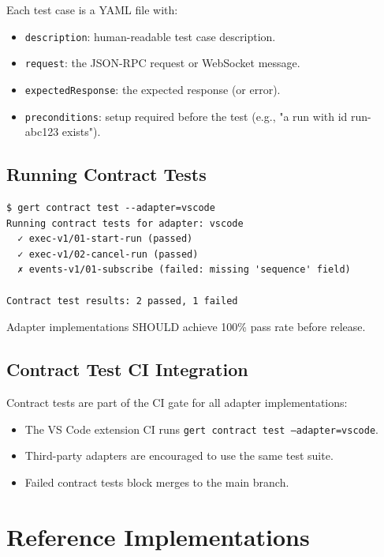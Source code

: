 Each test case is a YAML file with:

\begin{itemize}
  \item \texttt{description}: human-readable test case description.
  \item \texttt{request}: the JSON-RPC request or WebSocket message.
  \item \texttt{expectedResponse}: the expected response (or error).
  \item \texttt{preconditions}: setup required before the test (e.g., "a run
        with id run-abc123 exists").
\end{itemize}

\subsection{Running Contract Tests}

\begin{verbatim}
$ gert contract test --adapter=vscode
Running contract tests for adapter: vscode
  ✓ exec-v1/01-start-run (passed)
  ✓ exec-v1/02-cancel-run (passed)
  ✗ events-v1/01-subscribe (failed: missing 'sequence' field)

Contract test results: 2 passed, 1 failed
\end{verbatim}

Adapter implementations SHOULD achieve 100\% pass rate before release.

\subsection{Contract Test CI Integration}

Contract tests are part of the CI gate for all adapter implementations:

\begin{itemize}
  \item The VS Code extension CI runs \texttt{gert contract test
        --adapter=vscode}.
  \item Third-party adapters are encouraged to use the same test suite.
  \item Failed contract tests block merges to the main branch.
\end{itemize}

\section{Reference Implementations}
\label{sec:reference-implementations}


